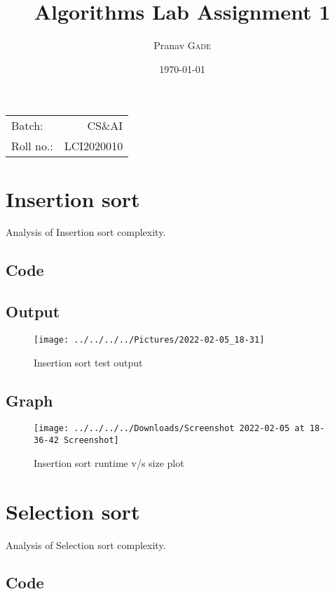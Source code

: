 \documentclass{article}
\title{Algorithms Lab Assignment 1} %
\author{Pranav \textsc{Gade}} %
\date{\today} %
\begin{document}
    \maketitle %

    \begin{center}
        \begin{tabular}{l r}
            Batch:    & CS\&AI     \\
            Roll no.: & LCI2020010
        \end{tabular}
    \end{center}


    \section{Insertion sort}
    Analysis of Insertion sort complexity.
    \subsection{Code}
    

    \subsection{Output}
    \begin{figure}[h!]
        \centering
        \texttt{[image: ../../../../Pictures/2022-02-05\_18-31]}
        \caption{Insertion sort test output}
    \end{figure}

    \subsection{Graph}
    \begin{figure}[h!]
        \centering
        \texttt{[image: ../../../../Downloads/Screenshot 2022-02-05 at 18-36-42 Screenshot]}
        \caption{Insertion sort runtime v/s size plot}
    \end{figure}

    \section{Selection sort}
    Analysis of Selection sort complexity.
    \subsection{Code}
    
\end{document}

